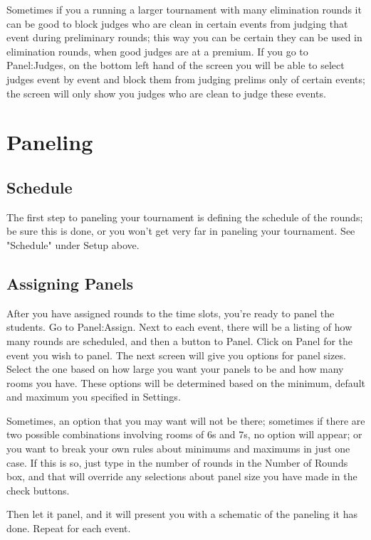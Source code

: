 \documentclass[12pt]{report} \usepackage {fullpage} \usepackage{times}
\begin{document}
Sometimes if you a running a larger tournament with many elimination rounds
it can be good to block judges who are clean in certain events from judging
that event during preliminary rounds; this way you can be certain they can
be used in elimination rounds, when good judges are at a premium.    If you
go to Panel:Judges, on the bottom left hand of the screen you will be able
to select judges event by event and block them from judging prelims only of
certain events; the screen will only show you judges who are clean to judge
these events.   
  

\chapter{Paneling}

 	
\section{Schedule}

The first step to paneling your tournament is defining the schedule of the
rounds; be sure this is done, or you won't get very far in paneling your
tournament.  See "Schedule" under Setup above.

\section{Assigning Panels}

After you have assigned rounds to the time slots, you're ready to panel the
students.   Go to Panel:Assign.    Next to each event, there will be a
listing of how many rounds are scheduled, and then a button to Panel.
Click on Panel for the event you wish to panel.  The next screen will give
you options for panel sizes.  Select the one based on how large you want
your panels to be and how many rooms you have.   These options will be
determined based on the minimum, default and maximum you specified in
Settings.

Sometimes, an option that you may want will not be there; sometimes if
there are two possible combinations involving rooms of 6s and 7s, no option
will appear; or you want to break your own rules about minimums and
maximums in just one case.  If this is so, just type in the number of
rounds in the Number of Rounds box, and that will override any selections
about panel size you have made in the check buttons.

Then let it panel, and it will present you with a schematic of the paneling
it has done.  Repeat for each event. 
\end{document}
